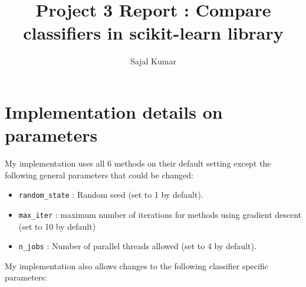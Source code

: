 \documentclass[12pt]{article}
\title{\textbf{Project 3 Report : Compare classifiers in scikit-learn library}}
\author{Sajal Kumar}
\date{}
\begin{document}
\maketitle

\section*{Implementation details on parameters}

My implementation uses all 6 methods on their default setting except the following general parameters that could be changed:

\begin{itemize}
\item \texttt{random\_state} : Random seed (set to 1 by default).
\item \texttt{max\_iter} : maximum number of iterations for methods using gradient descent (set to 10 by default)
\item \texttt{n\_jobs} : Number of parallel threads allowed (set to 4 by default).
\end{itemize}

My implementation also allows changes to the following classifier specific parameters:
\end{document}

